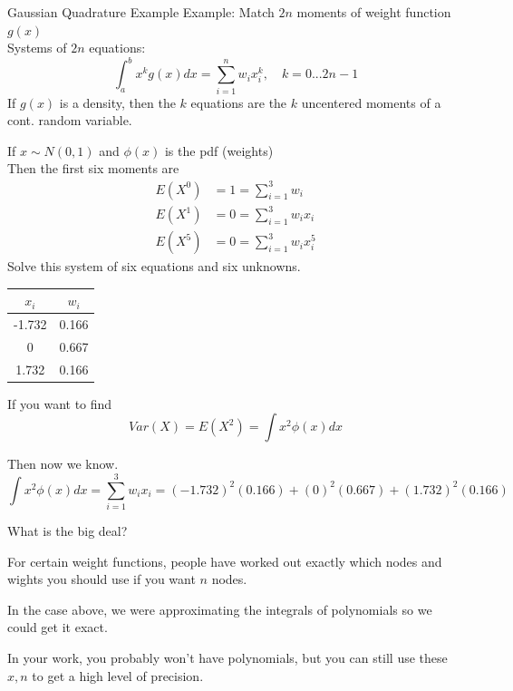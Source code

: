 \documentclass[notes,11pt, aspectratio=169]{beamer}
\newenvironment{wideitemize}{\itemize\addtolength{\itemsep}{10pt}}{\enditemize}
\begin{document}
\begin{frame}{Gaussian Quadrature Example}
Example: Match $2n$ moments of weight function $g(x)$\\
Systems of $2n$ equations:
    \[ \int_a^b x^k g(x)dx = \sum_{i=1}^n w_i x_i^k, \quad k = 0...2n-1 \]
    If $g(x)$ is a density, then the $k$ equations are the $k$ uncentered moments of a cont. random variable. 
\end{frame}
\begin{frame}
    If $x\sim N(0,1)$ and $\phi(x)$ is the pdf (weights)\\[1em] 
    Then the first six moments are
    \begin{align*}
    E(X^0) &= 1 = \sum_{i=1}^3 w_i \\
    E(X^1) &= 0 = \sum_{i=1}^3 w_i x_i \\
    E(X^{5}) &= 0 = \sum_{i=1}^3 w_i x_i^{5}
    \end{align*}
    Solve this system of six equations and six unknowns.
\begin{tabular}{cc}
\hline
$x_i$ & $w_i$ \\
\hline
-1.732 & 0.166 \\
0 & 0.667 \\
1.732 & 0.166 \\
\hline
\end{tabular}    
\end{frame}

\begin{frame}
If you want to find 
$$Var(X) = E(X^2) = \int x^2 \phi(x)dx$$

Then now we know. 
$$\int x^2 \phi(x)dx = \sum_{i=1}^3 w_i x_i = (-1.732)^2(0.166) + (0)^2(0.667) + (1.732)^2(0.166)$$

\vspace{1em}
What is the big deal? 
\begin{wideitemize}
    \item For certain weight functions, people have worked out exactly which nodes and wights you should use if you want $n$ nodes. 
    \item In the case above, we were approximating the integrals of polynomials so we could get it exact. 
    \item In your work, you probably won't have polynomials, but you can still use these $x,n$ to get a high level of precision.
\end{wideitemize}

\end{frame}


\end{document}
